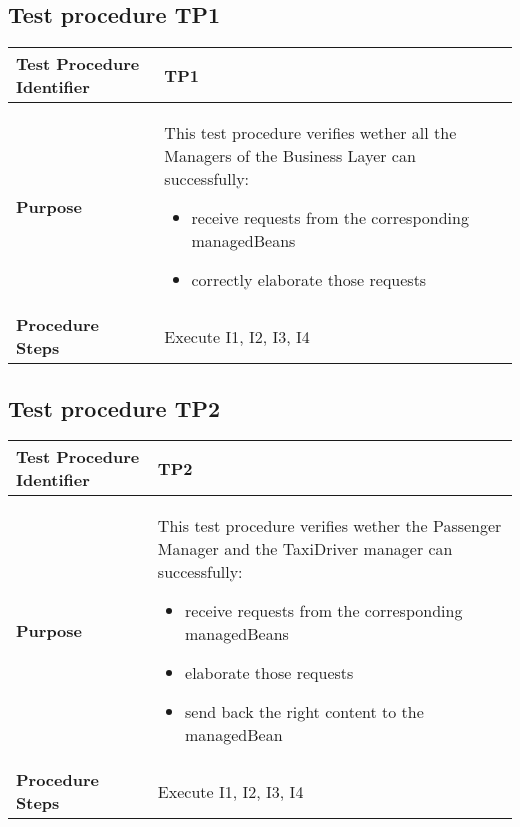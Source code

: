 \subsection{Test procedure TP1}

\begin{table}[!htbp]
\begin{center}
\begin{tabular}[t]{p{}p{}}

\hline
\textbf{Test Procedure Identifier} & TP1 \\
\hline
\textbf{Purpose} & This test procedure verifies wether all the Managers of the Business Layer can successfully:
\begin{itemize}
	\item receive requests from the corresponding managedBeans
	\item correctly elaborate those requests
\end{itemize} \\
\hline
\textbf{Procedure Steps} & Execute I1, I2, I3, I4 \\
\hline

\end{tabular}
\end{center}
\end{table}

\subsection{Test procedure TP2}

\begin{table}[!htbp]
\begin{center}
\begin{tabular}[t]{p{}p{}}

\hline
\textbf{Test Procedure Identifier} & TP2 \\
\hline
\textbf{Purpose} & This test procedure verifies wether the Passenger Manager and the TaxiDriver manager can successfully:
\begin{itemize}
	\item receive requests from the corresponding managedBeans
	\item elaborate those requests
	\item send back the right content to the managedBean
\end{itemize} \\
\hline
\textbf{Procedure Steps} & Execute I1, I2, I3, I4 \\
\hline

\end{tabular}
\end{center}
\end{table}
\clearpage

